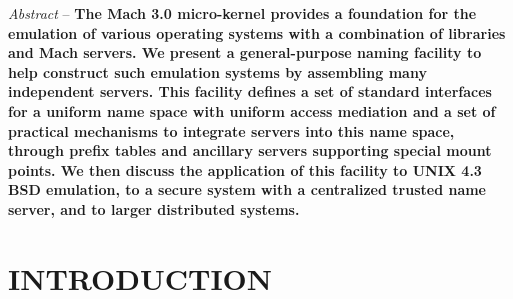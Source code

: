 \author{Daniel P. Julin}

\date{}



\maketitle

\renewcommand{\thefootnote}{}
\renewcommand{\thefootnote}{\arabic{footnote}}

{\small {\it Abstract} -- {\bf The Mach 3.0 micro-kernel provides a
foundation for the emulation of various operating systems with a
combination of libraries and Mach servers. We present a
general-purpose naming facility to help construct such emulation
systems by assembling many independent servers. This facility defines
a set of standard interfaces for a uniform name space with uniform
access mediation and a set of practical mechanisms to integrate
servers into this name space, through prefix tables and ancillary
servers supporting special mount points.  We then discuss the
application of this facility to UNIX 4.3 BSD emulation, to a secure
system with a centralized trusted name server, and to larger
distributed systems.  }} %

\section{INTRODUCTION}

